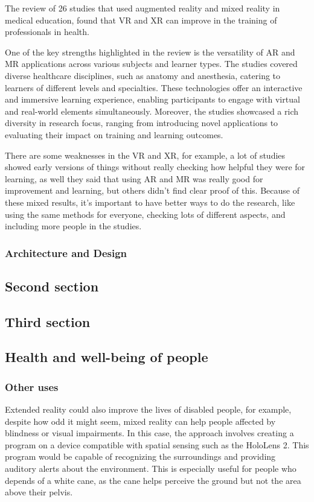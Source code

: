 \documentclass[twoside]{article}
\begin{document}
The review of 26 studies that used augmented reality and mixed reality in medical education, found that VR and XR can improve in the training of professionals in health.

One of the key strengths highlighted in the review is the versatility of AR and MR applications across various subjects and learner types. The studies covered diverse healthcare disciplines, such as anatomy and anesthesia, catering to learners of different levels and specialties. These technologies offer an interactive and immersive learning experience, enabling participants to engage with virtual and real-world elements simultaneously. Moreover, the studies showcased a rich diversity in research focus, ranging from introducing novel applications to evaluating their impact on training and learning outcomes.

There are some weaknesses in the VR and XR, for example, a lot of studies showed early versions of things without really checking how helpful they were for learning, as well they said that using AR and MR was really good for improvement and learning, but others didn't find clear proof of this. Because of these mixed results, it's important to have better ways to do the research, like using the same methods for everyone, checking lots of different aspects, and including more people in the studies.



\subsubsection{Architecture and Design}


\subsection{Second section}

\subsection{Third section}

\subsection{Health and well-being of people}
\subsubsection{Other uses}
Extended reality could also improve the lives of disabled people, for example, despite how odd it might seem, mixed reality can help people affected by blindness or visual impairments. In this case, the approach involves creating a program on a device compatible with spatial sensing such as the HoloLens 2. This program would be capable of recognizing the surroundings and providing auditory alerts about the environment. This is especially useful for people who depends of a white cane, as the cane helps perceive the ground but not the area above their pelvis.
\end{document}
